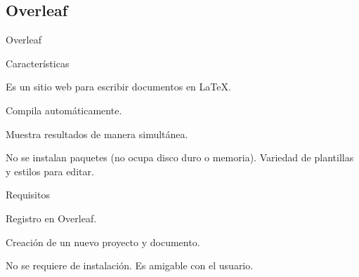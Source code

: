 \documentclass[aspectratio=169, 10pt]{beamer}
\begin{document}
\subsection{Overleaf}
\begin{frame}{Overleaf}
    \begin{alertblock}{Características}
        \item Es un sitio web para escribir documentos en \LaTeX.
        \item Compila automáticamente.
        \item Muestra resultados de manera simultánea.
        \item No se instalan paquetes (no ocupa disco duro o memoria). Variedad de plantillas y estilos para editar.
    \end{alertblock}
    \begin{alertblock}{Requisitos}
        \item Registro en Overleaf.
        \item Creación de un nuevo proyecto y documento.
        \item No se requiere de instalación. Es amigable con el usuario.
    \end{alertblock}
\end{frame}
\end{document}
